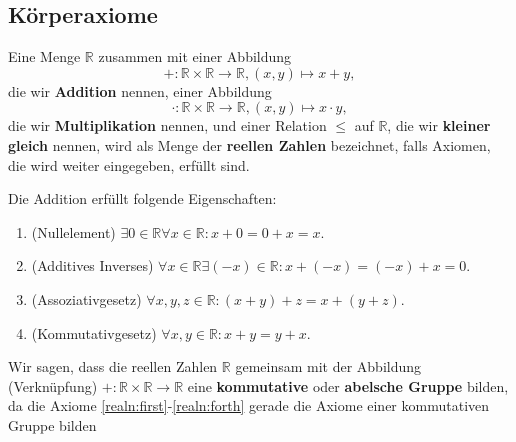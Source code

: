 \documentclass[../Analysis1_script.tex]{subfiles}
\begin{document}
\subsection{Körperaxiome}

\begin{definition}\label{realnumbers}
	Eine Menge $\mathbb{R}$ zusammen mit einer Abbildung
	\begin{equation}
		+ : \mathbb{R} \times \mathbb{R} \to \mathbb{R}, (x, y) \mapsto x + y,
	\end{equation}
	die wir \textbf{Addition} nennen, einer Abbildung
	\begin{equation}
		\cdot : \mathbb{R} \times \mathbb{R} \to \mathbb{R}, (x, y) \mapsto x \cdot y,
	\end{equation}
	die wir \textbf{Multiplikation} nennen, und einer Relation $\leq$ auf $\mathbb{R}$, die wir \textbf{kleiner gleich} nennen, wird als Menge der \textbf{reellen Zahlen} bezeichnet, falls Axiomen, die wird weiter eingegeben, erfüllt sind.
	\end{definition}

\begin{remark}
	Die Addition erfüllt folgende Eigenschaften:
	\begin{enumerate}
		\item \label{realn:first}(Nullelement) $\exists{0}\in\mathbb{R}\forall{x}\in\mathbb{R}: x + 0 = 0 + x = x$.
		\item \label{realn:second}(Additives Inverses) $\forall{x}\in\mathbb{R}\exists(-x)\in\mathbb{R}: x + (-x) = (-x) + x = 0$.
		\item \label{realn:third}(Assoziativgesetz) $\forall{x, y, z} \in \mathbb{R} : (x + y) + z = x + (y +z)$.
		\item \label{realn:forth}(Kommutativgesetz) $\forall{x, y} \in \mathbb{R} : x + y = y + x$.
	\end{enumerate}
\end{remark}

\begin{remark}
	Wir sagen, dass die reellen Zahlen $\mathbb{R}$ gemeinsam mit der Abbildung (Verknüpfung) $+ : \mathbb{R} \times \mathbb{R} \to \mathbb{R}$ eine \textbf{kommutative} oder \textbf{abelsche Gruppe} bilden, da die Axiome \ref{realn:first}-\ref{realn:forth} gerade die Axiome einer kommutativen Gruppe bilden 
\end{remark}
\end{document}
